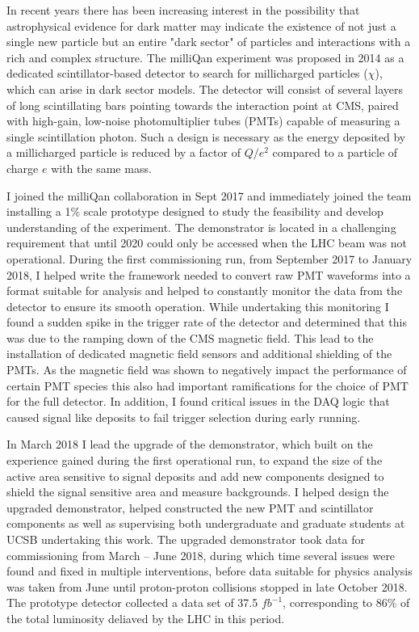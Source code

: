 \documentclass[11pt]{article}
\theoremstyle{plain} \numberwithin{equation}{section}
\theoremstyle{definition}
\begin{document}
In recent years there has been increasing interest in the possibility 
that astrophysical evidence for dark matter may indicate the existence 
of not just a single new particle but an entire "dark sector"
of particles and interactions with a rich and complex structure. The milliQan experiment 
was proposed in 2014 as a dedicated scintillator-based detector to search 
for millicharged particles ($\chi$), which can arise in dark sector models. 
The detector will consist of several layers of long scintillating bars pointing towards 
the interaction point at CMS, paired with high-gain, low-noise photomultiplier tubes (PMTs) 
capable of measuring a single scintillation photon. Such a design is necessary as the 
energy deposited by a millicharged particle 
is reduced by a factor of $Q/e^2$ compared to a particle of charge
$e$ with the same mass.

I joined the milliQan collaboration in Sept 2017 and immediately joined the
team installing a 1\% scale prototype designed to study the feasibility and
develop understanding of the experiment. The demonstrator is located in 
a challenging requirement that until 2020 could only be accessed when the LHC 
beam was not operational. During the first commissioning run, 
from September 2017 to January 2018, 
I helped write the framework needed to convert raw PMT waveforms into 
a format suitable for analysis and helped to constantly monitor
the data from the detector to ensure its smooth operation. While undertaking this 
monitoring I found a sudden spike in the trigger rate of the detector and determined
that this was due to the ramping down of the CMS magnetic field. This lead to the installation
of dedicated magnetic field sensors and additional shielding of the PMTs. As the magnetic field
was shown to negatively impact the performance of certain PMT species this also had
important ramifications for the choice of PMT for the full detector. In addition, I
found critical issues in the DAQ logic that caused signal like deposits to fail
trigger selection during early running.

In March 2018 I lead the upgrade of the demonstrator, which built on the experience 
gained during the first operational run, to expand the size of the active area
sensitive to signal deposits and add new components designed to shield the signal
sensitive area and measure backgrounds. I helped design the upgraded demonstrator,
helped constructed the new PMT and scintillator components as well as 
supervising both undergraduate and graduate students at UCSB undertaking this work.
The upgraded demonstrator took data for commissioning from March -- June 2018, during which 
time several issues were found and fixed in multiple interventions, before data suitable for physics
analysis was taken from June until proton-proton collisions stopped in late October 2018. 
The prototype detector collected a data set of 37.5 $fb^{-1}$, corresponding to 86\% of the total luminosity 
deliaved by the LHC in this period.
\end{document}
